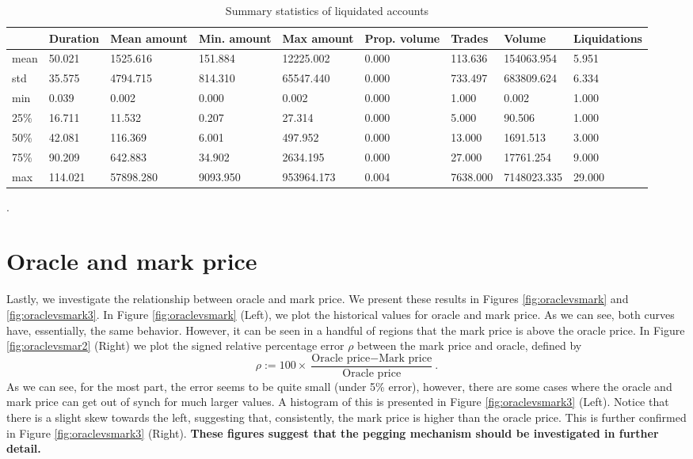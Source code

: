 \documentclass[]{scrartcl}
\begin{document}
	\begin{table}[]\scriptsize{
			\begin{tabular}{lllllllll}
				\toprule
				& Duration & Mean amount & Min. amount & Max amount & Prop. volume & Trades      & Volume         & Liquidations   \\ \midrule
				mean & 50.021 & 1525.616 & 151.884 & 12225.002 & 0.000 & 113.636 & 154063.954 & 5.951 \\
				std  & 35.575 & 4794.715 & 814.310 & 65547.440 & 0.000 & 733.497 & 683809.624 & 6.334 \\
				min  & 0.039  & 0.002    & 0.000   & 0.002     & 0.000 & 1.000   & 0.002      & 1.000 \\
				25\% & 16.711 & 11.532   & 0.207   & 27.314    & 0.000 & 5.000   & 90.506     & 1.000 \\
				50\% & 42.081 & 116.369  & 6.001   & 497.952   & 0.000 & 13.000  & 1691.513   & 3.000 \\
				75\% & 90.209 & 642.883  & 34.902  & 2634.195  & 0.000 & 27.000  & 17761.254  & 9.000 \\
				max & 114.021     & 57898.280    & 9093.950    & 953964.173  & 0.004                          & 7638.000 & 7148023.335 & 29.000\\\bottomrule
		\end{tabular}}
		\caption{Summary statistics of liquidated accounts}\label{tab:liq}.
	\end{table} 
	\section{Oracle and mark price}\label{sec:oracle}
	
	Lastly, we investigate the relationship between oracle and mark price. We present these results in Figures \ref{fig:oraclevsmark} and \ref{fig:oraclevsmark3}. In Figure \ref{fig:oraclevsmark} (Left), we plot the historical values for oracle and mark price. As we can see, both curves have, essentially, the same behavior. However, it can be seen in a handful of regions that the mark price is above the oracle price. In Figure \ref{fig:oraclevsmar2} (Right) we plot the signed relative percentage error $\rho$ between the mark price and oracle, defined by $$\rho:=100\times\frac{\text{Oracle price}-\text{Mark price}}{\text{Oracle price}}.$$ As we can see, for the most part, the error seems to be quite small (under 5\% error), however, there are some cases where the oracle and mark price can get out of synch for much larger values. A histogram of this is presented in Figure \ref{fig:oraclevsmark3} (Left). Notice that there is a slight skew towards the left, suggesting that, consistently, the mark price is higher than the oracle price. This is further confirmed in Figure \ref{fig:oraclevsmark3} (Right). \textbf{These figures suggest that the pegging mechanism should be investigated in further detail.}
	
\end{document}
